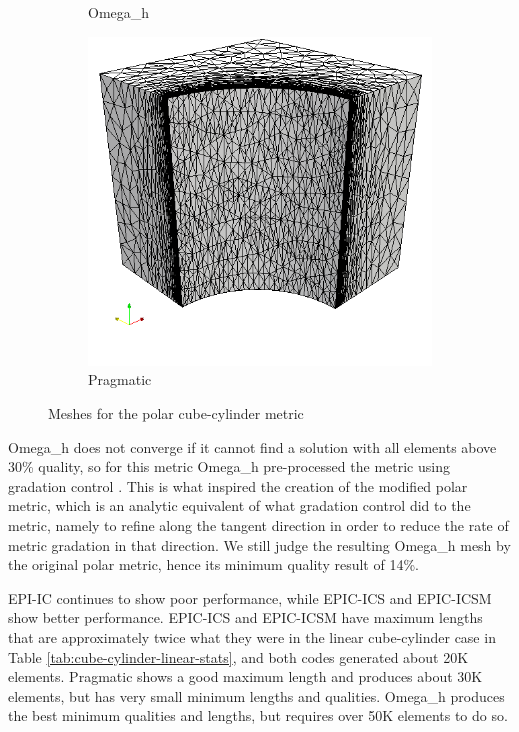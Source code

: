 \documentclass[3p,times,procedia,number]{elsarticle}
\begin{document}
\begin{figure}
\begin{subfigure}{.24\textwidth}
\caption{Omega\_h}
\end{subfigure}
\begin{subfigure}{.24\textwidth}
\centering
\includegraphics[width=\textwidth]{pragmatic-cube-cylinder-polar-1.png}
\caption{Pragmatic}
\end{subfigure}
\caption{Meshes for the polar cube-cylinder metric}
\label{fig:cube-cylinder-polar-1-meshes}
\end{figure}

Omega\_h does not converge if it cannot find a solution with
all elements above 30\% quality, so for this metric Omega\_h
pre-processed the metric using gradation control \cite{alauzet-fead-2010-size-gradation-aniso}.
This is what inspired the creation of the modified polar metric,
which is an analytic equivalent of what gradation control did
to the metric, namely to refine along the tangent direction
in order to reduce the rate of metric gradation in that direction.
We still judge the resulting Omega\_h mesh by the original polar
metric, hence its minimum quality result of 14\%.

EPI-IC continues to show poor performance, while EPIC-ICS
and EPIC-ICSM show better performance.
EPIC-ICS and EPIC-ICSM have maximum lengths that are approximately
twice what they were in the linear cube-cylinder case in
Table \ref{tab:cube-cylinder-linear-stats}, and both codes
generated about 20K elements.
Pragmatic shows a good maximum length and produces about 30K
elements, but has very small minimum lengths and qualities.
Omega\_h produces the best minimum qualities and lengths,
but requires over 50K elements to do so.
\end{document}
